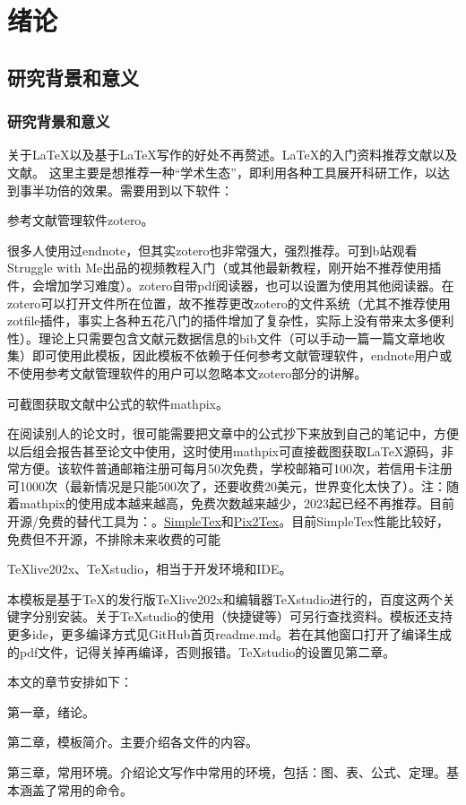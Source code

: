 \chapter{绪论}
%
\section{研究背景和意义}
\subsection{研究背景和意义}
%
关于\LaTeX{}以及基于\LaTeX{}写作的好处不再赘述。\LaTeX{}的入门资料推荐文献\parencite{_g}以及文献\parencite{_c}。
这里主要是想推荐一种“学术生态”，即利用各种工具展开科研工作，以达到事半功倍的效果。需要用到以下软件：
\begin{bracketedenum}
	\item 	参考文献管理软件zotero\cite{_m}。\par
	很多人使用过endnote，但其实zotero也非常强大，强烈推荐。可到b站观看Struggle with Me出品的视频教程\cite{_k}入门（或其他最新教程，刚开始不推荐使用插件，会增加学习难度）。zotero自带pdf阅读器，也可以设置为使用其他阅读器。在zotero可以打开文件所在位置，故不推荐更改zotero的文件系统（尤其不推荐使用zotfile插件，事实上各种五花八门的插件增加了复杂性，实际上没有带来太多便利性）。理论上只需要包含文献元数据信息的bib文件（可以手动一篇一篇文章地收集）即可使用此模板，因此模板不依赖于任何参考文献管理软件，endnote用户或不使用参考文献管理软件的用户可以忽略本文zotero部分的讲解。
	\item	可截图获取文献中公式的软件mathpix\cite{_h}。\par
	在阅读别人的论文时，很可能需要把文章中的公式抄下来放到自己的笔记中，方便以后组会报告甚至论文中使用，这时使用mathpix可直接截图获取\LaTeX{}源码，非常方便。该软件普通邮箱注册可每月50次免费，学校邮箱可100次，若信用卡注册可1000次（最新情况是只能500次了，还要收费20美元，世界变化太快了）。注：随着mathpix的使用成本越来越高，免费次数越来越少，2023起已经不再推荐。目前开源/免费的替代工具为：。\href{https://www.simpletex.cn/}{SimpleTex}和\href{https://p2t.breezedeus.com/}{Pix2Tex}。目前SimpleTex性能比较好，免费但不开源，不排除未来收费的可能
	\item	TeXlive202x、TeXstudio，相当于开发环境和IDE。\par
	本模板是基于TeX的发行版TeXlive202x和编辑器TeXstudio进行的，百度这两个关键字分别安装。关于TeXstudio的使用（快捷键等）可另行查找资料。模板还支持更多ide，更多编译方式见GitHub首页readme.md。若在其他窗口打开了编译生成的pdf文件，记得关掉再编译，否则报错。TeXstudio的设置见第二章。
\end{bracketedenum}

本文的章节安排如下：

第一章，绪论。

第二章，模板简介。主要介绍各文件的内容。

第三章，常用环境。介绍论文写作中常用的环境，包括：图、表、公式、定理。基本涵盖了常用的命令。



